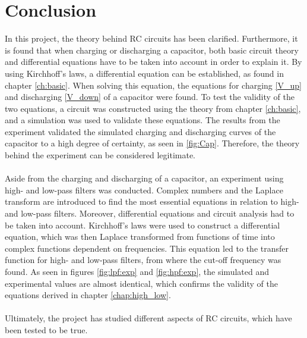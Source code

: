 \chapter{Conclusion}
In this project, the theory behind RC circuits has been clarified. Furthermore, it is found that when charging or discharging a capacitor, both basic circuit theory and differential equations have to be taken into account in order to explain it. By using Kirchhoff's laws, a differential equation can be established, as found in chapter \ref{ch:basic}. When solving this equation, the equations for charging \eqref{V_up} and discharging \eqref{V_down} of a capacitor were found. To test the validity of the two equations, a circuit was constructed using the theory from chapter \ref{ch:basic}, and a simulation was used to validate these equations. The results from the experiment validated the simulated charging and discharging curves of the capacitor to a high degree of certainty, as seen in \ref{fig:Cap}. Therefore, the theory behind the experiment can be considered legitimate.
\\ \\
Aside from the charging and discharging of a capacitor, an experiment using high- and low-pass filters was conducted. Complex numbers and the Laplace transform are introduced to find the most essential equations in relation to high- and low-pass filters. Moreover, differential equations and circuit analysis had to be taken into account. Kirchhoff's laws were used to construct a differential equation, which was then Laplace transformed from functions of time into complex functions dependent on frequencies. This equation led to the transfer function for high- and low-pass filters, from where the cut-off frequency was found. As seen in figures \ref{fig:lpf:exp} and \ref{fig:hpf:exp}, the simulated and experimental values are almost identical, which confirms the validity of the equations derived in chapter \ref{chap:high_low}.
\\ \\
Ultimately, the project has studied different aspects of RC circuits, which have been tested to be true. 
